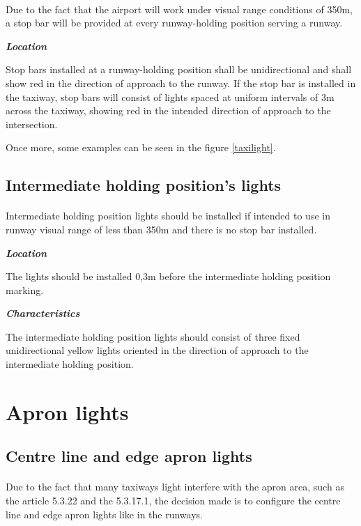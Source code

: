 		\paragraph{}Due to the fact that the airport will work under visual range conditions of 350m, a stop bar will be provided at every runway-holding position serving a runway. 
		
		\textbf{\textit{Location}}
		
		Stop bars installed at a runway-holding position shall be unidirectional and shall show red in the direction of approach to the runway. If the stop bar is installed in the taxiway, stop bars will consist of lights spaced at uniform intervals of 3m across the taxiway, showing red in the intended direction of approach to the intersection.
		
		Once more, some examples can be seen in the figure \ref{taxilight}.
		
		\subsection{Intermediate holding position's lights}
		\paragraph{}Intermediate holding position lights should be installed if intended to use in runway visual range of less than 350m and there is no stop bar installed. 
		
		\textbf{\textit{Location}}
		
		The lights should be installed 0,3m before the intermediate holding position marking.
		
		\textbf{\textit{Characteristics}}
		
		The intermediate holding position lights should consist of three fixed unidirectional yellow lights oriented in the direction of approach to the intermediate holding position.
		
	
	\section{Apron lights}
		\subsection{Centre line and edge apron lights}
		\paragraph{}Due to the fact that many taxiways light interfere with the apron area, such as the article 5.3.22 and the 5.3.17.1, the decision made is to configure the centre line and edge apron lights like in the runways.
	
